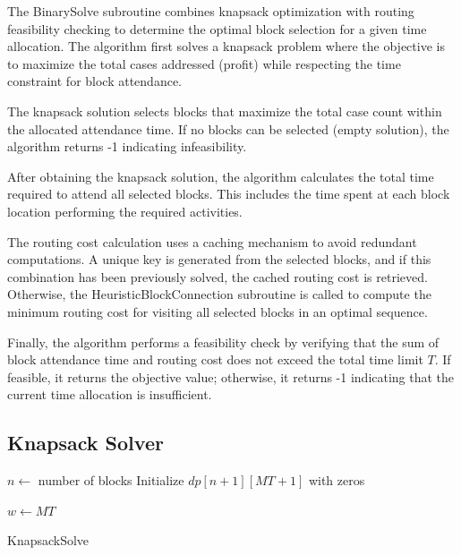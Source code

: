 The BinarySolve subroutine combines knapsack optimization with
routing feasibility checking to determine the optimal block selection for a given time allocation.
The algorithm first solves a knapsack problem where the objective is to maximize the total cases
addressed (profit) while respecting the time constraint for block attendance.

The knapsack solution selects blocks that maximize the total case count within the allocated attendance
time. If no blocks can be selected (empty solution), the algorithm returns -1 indicating infeasibility.

After obtaining the knapsack solution, the algorithm calculates the total time required to attend
all selected blocks. This includes the time spent at each block location performing the required activities.

The routing cost calculation uses a caching mechanism to avoid redundant computations. A unique
key is generated from the selected blocks, and if this combination has been previously solved,
the cached routing cost is retrieved. Otherwise, the HeuristicBlockConnection subroutine is called
to compute the minimum routing cost for visiting all selected blocks in an optimal sequence.

Finally, the algorithm performs a feasibility check by verifying that the sum of block attendance
time and routing cost does not exceed the total time limit $T$. If feasible, it returns the
objective value; otherwise, it returns -1 indicating that the current time allocation is insufficient.

\subsection{Knapsack Solver}

\begin{algorithm}[H]
	\SetAlgoLined

	$n \leftarrow$ number of blocks\;
	Initialize $dp[n+1][MT+1]$ with zeros\;


	$w \leftarrow MT$\;

	\;
	\caption{KnapsackSolve}
\end{algorithm}

